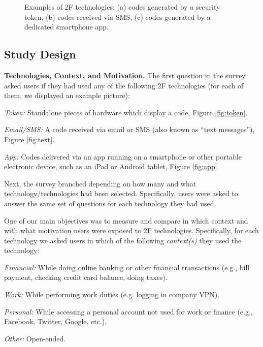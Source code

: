 \documentclass[conference]{IEEEtran}
\begin{document}
\begin{figure*}[ttt]
\centering
{}
\caption{Examples of 2F technologies: (a) codes generated by a security token, (b) codes received via SMS, (c) codes generated by a dedicated smartphone app.}
\vspace{0.1cm}
\end{figure*}





\subsection{Study Design} 

\noindent\textbf{Technologies, Context, and Motivation.} The first question in the survey asked users if they had used any of the following 2F technologies (for each of them, we displayed an example picture):

\begin{compactitem}
\item {\em Token:} Standalone pieces of hardware which display a code, Figure \ref{fig:token}.
\item {\em Email/SMS:} A code received via email or SMS (also known as ``text messages''), Figure \ref{fig:text}.
\item {\em App:} Codes delivered via an app running on a smartphone or other portable electronic device, such as an iPad or Android tablet, Figure \ref{fig:app}.
\end{compactitem}


Next, the survey branched depending on how many and what technology/technologies had been selected.
Specifically, users were asked to answer the same set of questions for each technology they had used.


One of our main objectives was to measure and compare in which context and with what motivation users were exposed to 2F technologies. Specifically, for each technology we asked users in which of the following {\em context(s)} they used the technology:
\begin{compactitem}
\item {\em Financial:} While doing online banking or other financial transactions (e.g., bill payment, checking credit card
balance, doing taxes).
\item {\em Work:} While performing work duties (e.g. logging in company VPN).
\item {\em Personal:} While accessing a personal account not used for work or finance (e.g., Facebook, Twitter, Google, etc.).
\item {\em Other:} Open-ended.
\end{compactitem}
\end{document}
